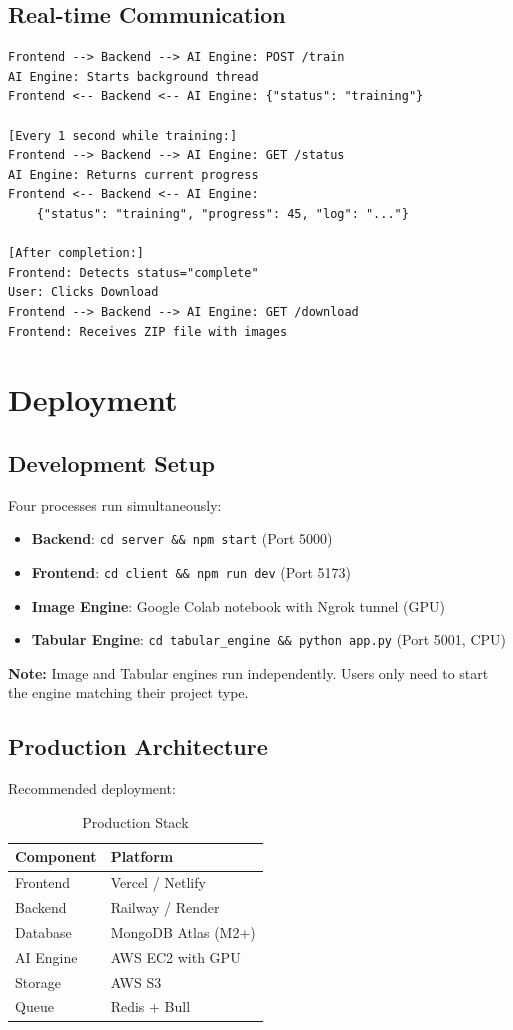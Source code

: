 \documentclass[11pt,a4paper]{article}
\begin{document}
\subsection{Real-time Communication}

\begin{verbatim}
Frontend --> Backend --> AI Engine: POST /train
AI Engine: Starts background thread
Frontend <-- Backend <-- AI Engine: {"status": "training"}

[Every 1 second while training:]
Frontend --> Backend --> AI Engine: GET /status
AI Engine: Returns current progress
Frontend <-- Backend <-- AI Engine: 
    {"status": "training", "progress": 45, "log": "..."}

[After completion:]
Frontend: Detects status="complete"
User: Clicks Download
Frontend --> Backend --> AI Engine: GET /download
Frontend: Receives ZIP file with images
\end{verbatim}

\section{Deployment}

\subsection{Development Setup}

Four processes run simultaneously:
\begin{itemize}[noitemsep]
    \item \textbf{Backend}: \texttt{cd server \&\& npm start} (Port 5000)
    \item \textbf{Frontend}: \texttt{cd client \&\& npm run dev} (Port 5173)
    \item \textbf{Image Engine}: Google Colab notebook with Ngrok tunnel (GPU)
    \item \textbf{Tabular Engine}: \texttt{cd tabular\_engine \&\& python app.py} (Port 5001, CPU)
\end{itemize}

\textbf{Note:} Image and Tabular engines run independently. Users only need to start the engine matching their project type.

\subsection{Production Architecture}

Recommended deployment:
\begin{table}[H]
\centering
\small
\begin{tabular}{ll}
\toprule
\textbf{Component} & \textbf{Platform} \\
\midrule
Frontend & Vercel / Netlify \\
Backend & Railway / Render \\
Database & MongoDB Atlas (M2+) \\
AI Engine & AWS EC2 with GPU \\
Storage & AWS S3 \\
Queue & Redis + Bull \\
\bottomrule
\end{tabular}
\caption{Production Stack}
\end{table}
\end{document}
